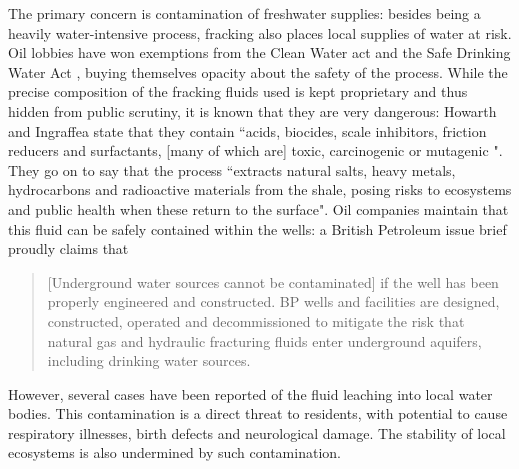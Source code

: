 \documentclass[12pt,letterpaper]{article}
\begin{document}
The primary concern is contamination of freshwater supplies: besides being a heavily water-intensive process, fracking also places local supplies of water at risk. Oil lobbies have won exemptions from the Clean Water act and the Safe Drinking Water Act \cite[272]{nature}, buying themselves opacity about the safety of the process.
While the precise composition of the fracking fluids used is kept proprietary and thus hidden from public scrutiny, it is known that they are very dangerous: Howarth and Ingraffea state that they contain ``acids, biocides, scale inhibitors, friction reducers and surfactants, [many of which are] toxic, carcinogenic or mutagenic ". They go on to say that the process ``extracts natural salts, heavy metals, hydrocarbons and radioactive materials from the shale, posing risks to ecosystems and public health when these return to the surface"\cite[272]{nature}.
Oil companies maintain that this fluid can be safely contained within the wells: a British Petroleum issue brief proudly claims that
\begin{quote}
[Underground water sources cannot be contaminated] if the well has been properly engineered and constructed. BP wells and facilities are designed, constructed, operated and decommissioned to mitigate the risk that natural gas and hydraulic fracturing fluids enter underground aquifers, including drinking water sources. \cite[4]{bp}
\end{quote}
 However, several cases have been reported \cite[272]{nature} of the fluid leaching into local water bodies. This contamination is a direct threat to residents, with potential to cause respiratory illnesses, birth defects and neurological damage. The stability of local ecosystems is also undermined by such contamination. 
\end{document}
